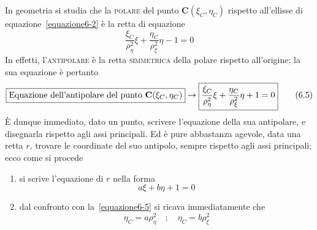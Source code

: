 \noindent In geometria si studia che la \textsc{polare} del punto $\mathbf{C}(\xi_{C}, \eta_{C})$ rispetto all'ellisse di equazione~\eqref{equazione6-2} è la retta di equazione 
\begin{equation*}
\boxed{\frac{\xi_C}{\rho_{\eta}^{2}}\xi+\frac{\eta_C}{\rho_{\xi}^{2}}\eta -1 = 0}
\end{equation*}
In effetti, l'\textsc{antipolare} è la retta \textsc{simmetrica} della polare rispetto all'origine; la sua equazione è pertanto 
\begin{equation} \label{equazione6-5}
\boxed{\textup{Equazione dell'antipolare del punto }\mathbf{C}(\xi_{C}, \eta_{C})} \rightarrow \boxed{\frac{\xi_C}{\rho_{\eta}^{2}}\xi+\frac{\eta_C}{\rho_{\xi}^{2}}\eta + 1 = 0}
\tag{6.5}
\end{equation}
È dunque immediato, dato un punto, scrivere l'equazione della sua antipolare, e disegnarla rispetto agli assi principali. Ed è pure abbastanza agevole, data una retta $r$, trovare le coordinate del suo antipolo, sempre rispetto agli assi principali; ecco come si procede 
\begin{enumerate}
\item si scrive l'equazione di $r$ nella forma 
\begin{equation*}
a\xi+b\eta+1=0
\end{equation*}
\item dal confronto con la~\eqref{equazione6-5} si ricava immediatamente che 
\begin{equation} \label{equazione6-6}
\boxed{\eta_C = a\rho_{\eta}^{2} \quad ; \quad \eta_C = b\rho_{\xi}^{2}}
\tag{6.6}
\end{equation}
\end{enumerate}

